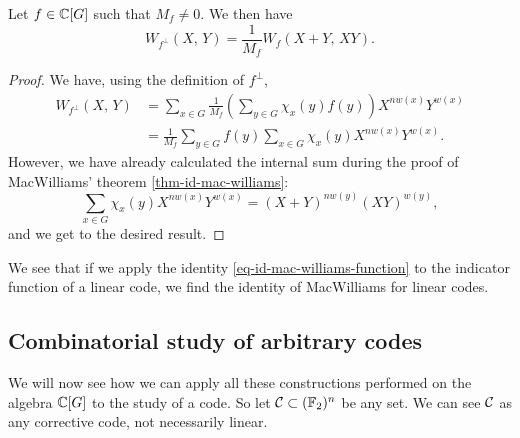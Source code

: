 \begin{thm}
\label{thm-id-mac-williams-functions}
 Let $ f \in \mathbb{C} [G] $ such that $ M_f \neq 0 $. We then have
\begin{equation}
\label{eq-id-mac-williams-function}
W_{f^{\bot}} (X, \, Y) = \frac{1}{M_f} W_{f} (X + Y, \, XY).
\end{equation}
\end{thm}
\begin{proof}
We have, using the definition of $ f^\bot $,
\begin{align*}
W_{f^{\bot}} (X, \, Y) & = \sum_{x \in G}{\frac{1}{M_f} \left(\sum_{y \in G}{\chi_x ( y) f(y)} \right) X^{nw (x)} Y^{w (x)}} \\
& = \frac{1}{M_f} \sum_{y \in G}{f(y) \sum_{x \in G}{\chi_x (y) X^{nw (x)} Y^{w ( x)}}}.
\end{align*}
However, we have already calculated the internal sum during the proof of MacWilliams' theorem \ref{thm-id-mac-williams}:
\begin{equation*}
\sum_{x \in G}{\chi_x (y) X^{nw (x)} Y^{w (x)}} = (X + Y)^{nw (y)} (XY)^{w (y)},
\end{equation*}
and we get to the desired result.
\end{proof}
We see that if we apply the identity \eqref{eq-id-mac-williams-function} to the indicator function of a linear code, we find the identity of MacWilliams for linear codes.

\subsection{Combinatorial study of arbitrary codes}
 
We will now see how we can apply all these constructions performed on the algebra $ \mathbb{C} [G] $ to the study of a code. So let $ \mathcal{C} \subset (\mathbb{F}_2)^n $ be any set. We can see $ \mathcal{C} $ as any corrective code, not necessarily linear.
 
